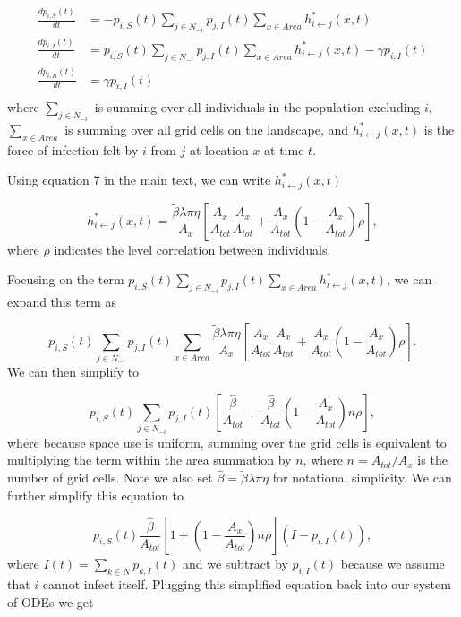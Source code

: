 \documentclass[11pt]{article}
\begin{document}
\begin{equation}
    \begin{aligned}
        \frac{d p_{i, S}(t)}{dt} &= -p_{i, S}(t) \sum_{j \in N_{-i}} p_{j, I}(t) \sum_{x \in Area} h_{i \leftarrow j}^*(x, t) \\
        \frac{d p_{i, I}(t)}{dt} &= p_{i, S}(t) \sum_{j \in N_{-i}} p_{j, I}(t)  \sum_{x \in Area} h_{i \leftarrow j}^*(x, t) - \gamma p_{i, I}(t) \\
        \frac{d p_{i, R}(t)}{dt} &= \gamma p_{i, I}(t) \\
    \end{aligned}
    \label{eq:sir_individual}
\end{equation}
where $\sum_{j \in N_{-i}}$ is summing over all individuals in the population excluding $i$, $\sum_{x \in Area}$ is summing over all grid cells on the landscape, and $h^*_{i \leftarrow j}(x, t)$ is the force of infection felt by $i$ from $j$ at location $x$ at time $t$.

Using equation 7 in the main text, we can write $h^*_{i \leftarrow j}(x, t)$

$$
h^*_{i \leftarrow j}(x, t) = \frac{\tilde{\beta} \lambda \pi \eta}{A_x} \left[\frac{A_x}{A_{tot}}\frac{A_x}{A_{tot}} + \frac{A_x}{A_{tot}}(1 - \frac{A_x}{A_{tot}}) \rho \right],
$$
where $\rho$ indicates the level correlation between individuals. 

Focusing on the term $p_{i, S}(t) \sum_{j \in N_{-i}} p_{j, I}(t) \sum_{x \in Area} h_{i \leftarrow j}^*(x, t)$, we can expand this term as

$$
p_{i, S}(t) \sum_{j \in N_{-i}} p_{j, I}(t) \sum_{x \in Area} \frac{\tilde{\beta} \lambda \pi \eta}{A_x} \left[\frac{A_x}{A_{tot}}\frac{A_x}{A_{tot}} + \frac{A_x}{A_{tot}}(1 - \frac{A_x}{A_{tot}}) \rho \right].
$$
We can then simplify to

$$
p_{i, S}(t) \sum_{j \in N_{-i}} p_{j, I}(t)  \left[\frac{\hat{\beta}}{A_{tot}} + \frac{\hat{\beta}}{A_{tot}}(1 - \frac{A_x}{A_{tot}}) n \rho \right],
$$
where because space use is uniform, summing over the grid cells is equivalent to multiplying the term within the area summation by $n$, where $n = A_{tot} / A_x$ is the number of grid cells. Note we also set $\hat{\beta} = \tilde{\beta} \lambda \pi \eta$ for notational simplicity. We can further simplify this equation to

$$
p_{i, S}(t) \frac{\hat{\beta}}{A_{tot}} \left[1 + (1 - \frac{A_x}{A_{tot}}) n \rho \right] (I - p_{i, I}(t)),
$$
where $I(t) = \sum_{k \in N} p_{k, I}(t)$ and we subtract by $p_{i, I}(t)$ because we assume that $i$ cannot infect itself. Plugging this simplified equation back into our system of ODEs we get
\end{document}
